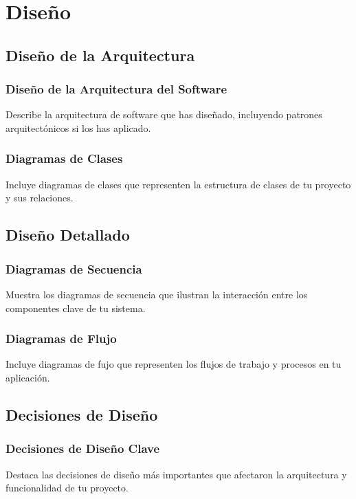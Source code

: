 \section{Diseño}

\subsection{Diseño de la Arquitectura}

\subsubsection{Diseño de la Arquitectura del Software}
Describe la arquitectura de software que has diseñado, incluyendo patrones arquitectónicos si los has aplicado.

\subsubsection{Diagramas de Clases}
Incluye diagramas de clases que representen la estructura de clases de tu proyecto y sus relaciones.

\subsection{Diseño Detallado}

\subsubsection{Diagramas de Secuencia}
Muestra los diagramas de secuencia que ilustran la interacción entre los componentes clave de tu sistema.

\subsubsection{Diagramas de Flujo}
Incluye diagramas de fujo que representen los flujos de trabajo y procesos en tu aplicación.

\subsection{Decisiones de Diseño}

\subsubsection{Decisiones de Diseño Clave}
Destaca las decisiones de diseño más importantes que afectaron la arquitectura y funcionalidad de tu proyecto.

